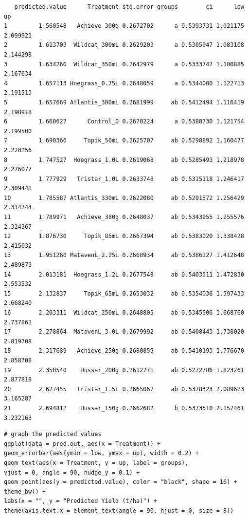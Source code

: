 \documentclass[a4paper, 10pt, fleqn, twosided]{memoir}
\begin{document}
\begin{tcolorbox}[title = Example 6 Tukey's multiple comparison output]
\begin{verbatim}
   predicted.value      Treatment std.error groups        ci      low       up
1         1.560548   Achieve_300g 0.2672702      a 0.5393731 1.021175 2.099921
2         1.613703  Wildcat_300mL 0.2629203      a 0.5305947 1.083108 2.144298
3         1.634260  Wildcat_350mL 0.2642979      a 0.5333747 1.100885 2.167634
4         1.657113 Hoegrass_0.75L 0.2648059      a 0.5344000 1.122713 2.191513
5         1.657669 Atlantis_300mL 0.2681999     ab 0.5412494 1.116419 2.198918
6         1.660627      Control_0 0.2670224      a 0.5388730 1.121754 2.199500
7         1.690366     Topik_50mL 0.2625707     ab 0.5298892 1.160477 2.220256
8         1.747527  Hoegrass_1.0L 0.2619068     ab 0.5285493 1.218978 2.276077
9         1.777929   Tristar_1.0L 0.2633748     ab 0.5315118 1.246417 2.309441
10        1.785587 Atlantis_330mL 0.2622080     ab 0.5291572 1.256429 2.314744
11        1.789971   Achieve_380g 0.2648037     ab 0.5343955 1.255576 2.324367
12        1.876730     Topik_85mL 0.2667394     ab 0.5383020 1.338428 2.415032
13        1.951260 MatavenL_2.25L 0.2668934     ab 0.5386127 1.412648 2.489873
14        2.013181  Hoegrass_1.2L 0.2677548     ab 0.5403511 1.472830 2.553532
15        2.132837     Topik_65mL 0.2653032     ab 0.5354036 1.597433 2.668240
16        2.203311  Wildcat_250mL 0.2648805     ab 0.5345506 1.668760 2.737861
17        2.278864  MatavenL_3.0L 0.2679992     ab 0.5408443 1.738020 2.819708
18        2.317689   Achieve_250g 0.2680859     ab 0.5410193 1.776670 2.858708
19        2.350540    Hussar_200g 0.2612771     ab 0.5272786 1.823261 2.877818
20        2.627455   Tristar_1.5L 0.2665067     ab 0.5378323 2.089623 3.165287
21        2.694812    Hussar_150g 0.2662682      b 0.5373510 2.157461 3.232163

\end{verbatim}
\end{tcolorbox}

\begin{tcolorbox}[title = Example 6 Graph of predicted values]
\begin{verbatim}
# graph the predicted values 
ggplot(data = pred.out, aes(x = Treatment)) +
geom_errorbar(aes(ymin = low, ymax = up), width = 0.2) +
geom_text(aes(x = Treatment, y = up, label = groups),
vjust = 0, angle = 90, nudge_y = 0.1) +
geom_point(aes(y = predicted.value), color = "black", shape = 16) +
theme_bw() +
labs(x = "", y = "Predicted Yield (t/ha)") +
theme(axis.text.x = element_text(angle = 90, hjust = 0, size = 8))
\end{verbatim}
\end{tcolorbox}
\end{document}
